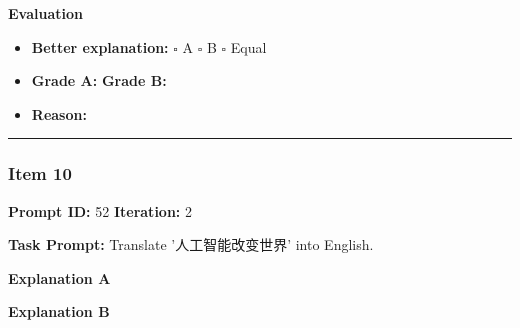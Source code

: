 \documentclass[11pt]{article}
\begin{document}
\vspace{1em}

\textbf{Evaluation}
\begin{itemize}
    \item \textbf{Better explanation:} \hspace{1em} $\square$ A \hspace{1em} $\square$ B \hspace{1em} $\square$ Equal
    \item \textbf{Grade A:} \underline{\hspace{2cm}} \hspace{1em} \textbf{Grade B:} \underline{\hspace{2cm}}
    \item \textbf{Reason:} \\[4.5em]
\end{itemize}

\vspace{1em}
\hrule
\vspace{1em}


\subsubsection*{Item 10}
\textbf{Prompt ID:} 52 \hfill \textbf{Iteration:} 2

\textbf{Task Prompt:} Translate '人工智能改变世界' into English.

\vspace{0.75em}
\noindent
\begin{minipage}[t]{0.48\textwidth}
\textbf{Explanation A}

\vspace{0.5em}
\end{minipage}
\hfill
\begin{minipage}[t]{0.48\textwidth}
\textbf{Explanation B}

\vspace{0.5em}
\end{minipage}

\vspace{1em}
\end{document}
